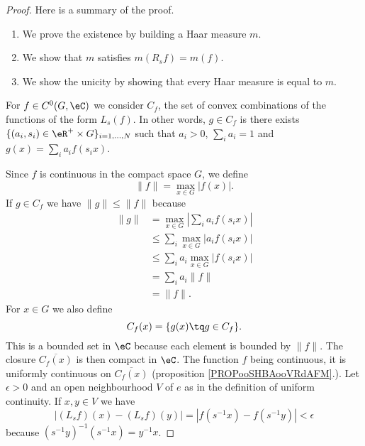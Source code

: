 \begin{proof}
    Here is a summary of the proof.
    \begin{enumerate}
        \item
            We prove the existence by building a Haar measure \( m\).
        \item
            We show that \( m\) satisfies \( m(R_sf)=m(f)\).
        \item
            We show the unicity by showing that every Haar measure is equal to \( m\).
    \end{enumerate}

    For \( f\in C^0(G,\eC)\) we consider \( C_f\), the set of convex combinations of the functions of the form \( L_s(f)\). In other words, \( g\in C_f\) is there exists \( \{ (a_i,s_i)\in \eR^+\times G \}_{i=1,\ldots, N}\) such that \( a_i>0\), \( \sum_ia_i=1\) and \( g(x)=\sum_ia_if(s_ix)\).

    Since \( f\) is continuous in the compact space \( G\), we define
    \begin{equation}
        \| f \|=\max_{x\in G}| f(x) |.
    \end{equation}
    If \( g\in C_f\) we have \( \| g \|\leq \| f \|\) because
    \begin{subequations}
        \begin{align}
            \| g \|&=\max_{x\in G}| \sum_ia_if(s_ix) |\\
            &\leq\sum_i\max_{x\in G}| a_if(s_ix) |\\
            &\leq \sum_ia_i\max_{x\in G}| f(s_ix) |\\
            &=\sum_ia_i\| f \|\\
            &=\| f \|.
        \end{align}
    \end{subequations}
    For \( x\in G\) we also define
    \begin{equation}
        C_f(x)=\{ g(x)\tq g\in C_f \}.
    \end{equation}
    This is a bounded set in \( \eC\) because each element is bounded by \( \| f \|\). The closure \( \overline{ C_f(x) }\) is then compact in \( \eC\). The function \( f\) being continuous, it is uniformly continuous on \( \overline{ C_f(x) }\) (proposition \ref{PROPooSHBAooVRdAFM}.). Let \( \epsilon>0\) and an open neighbourhood \( V\) of \( e\) as in the definition of uniform continuity. If \( x,y\in V\) we have
    \begin{equation}
        | (L_sf)(x)-(L_sf)(y) |=| f(s^{-1}x)-f(s^{-1} y) |<\epsilon
    \end{equation}
    because \( (s^{-1}y)^{-1}(s^{-1}x)=y^{-1}x\).


\end{proof}
